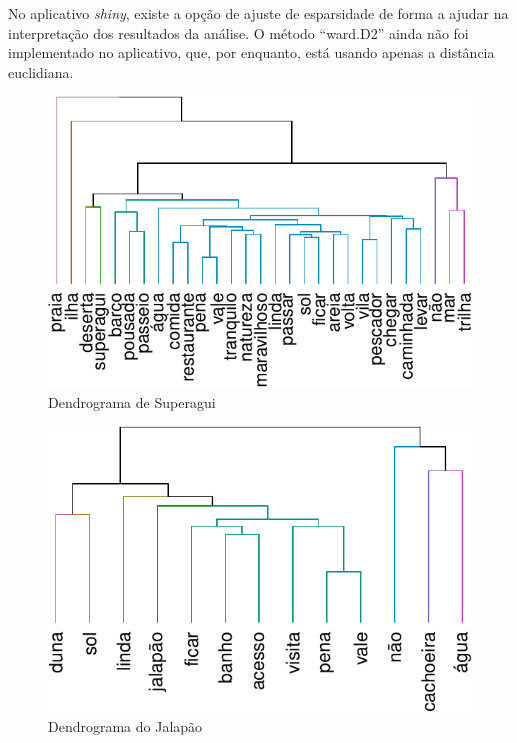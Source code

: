 \documentclass[preprint, 3p,
authoryear]{elsarticle} %
\begin{document}
No aplicativo \emph{shiny}, existe a opção de ajuste de esparsidade de
forma a ajudar na interpretação dos resultados da análise. O método
``ward.D2'' ainda não foi implementado no aplicativo, que, por enquanto,
está usando apenas a distância euclidiana.

\begin{figure}[H]

{\centering \includegraphics{bookdown-artigo_files/figure-latex/fig10-1} 

}

\caption{Dendrograma de Superagui}\label{fig:fig10}
\end{figure}

\begin{figure}[H]

{\centering \includegraphics{bookdown-artigo_files/figure-latex/fig11-1} 

}

\caption{Dendrograma do Jalapão}\label{fig:fig11}
\end{figure}
\end{document}
